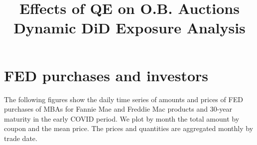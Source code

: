 \documentclass[11pt,a4paper]{article}
\begin{document}
\title{Effects of QE on O.B. Auctions \\ Dynamic DiD Exposure Analysis}

\maketitle

\section{FED purchases and investors}

The following figures show the daily time series of amounts and prices of FED purchases of MBAs for Fannie Mae and Freddie Mac
 products and 30-year maturity in the early COVID period. We plot by month the total amount by coupon and the mean price. 
 The prices and quantities are aggregated monthly by trade date. 
\end{document}

